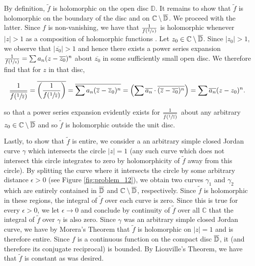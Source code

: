 \begin{solution}
    By definition, $\tilde{f}$ is holomorphic on the open disc $\mathbb{D}$. It remains to show that $\tilde{f}$ is 
    holomorphic on the boundary of the disc and on $\mathbb{C} \setminus \overline{\mathbb{D}}$. We proceed with the latter. Since $f$ 
    is non-vanishing, we have that $\frac{1}{f(\sfrac{1}{z})}$ is holomorphic whenever $|z| > 1$ as a composition of 
    holomorphic functions . Let $z_0 \in \mathbb{C} \setminus \overline{\mathbb{D}}$. Since $|z_0| > 1$, we observe that 
    $|\overline{z_0}| > 1$ and hence there exists a power series expansion 
    $\frac{1}{f(\sfrac{1}{z})} = \sum a_n (z - \overline{z_0})^n$ about $\overline{z_0}$ in some sufficiently small open 
    disc. We therefore find that for $z$ in that disc,

    $$
    \frac{1}{\overline{f(\sfrac{1}{\overline{z}})}}
    = \overline{\left(\frac{1}{f(\sfrac{1}{\overline{z}})} \right)} 
    = \overline{\sum a_n (\overline{z} - \overline{z}_0)^n}
    = \left( \sum \overline{a_n} \cdot \overline{(\overline{z} - \overline{z_0})^n} \right)
    = \sum \overline{a_n} (z - z_0)^n.
    $$

    so that a power series expansion evidently exists for $\frac{1}{\overline{f(\sfrac{1}{\overline{z}})}}$ about any 
    arbitrary $z_0 \in \mathbb{C} \setminus \overline{\mathbb{D}}$ and so $\tilde{f}$ is holomorphic outside the unit disc.

    Lastly, to show that $\tilde{f}$ is entire, we consider a an arbitrary simple closed Jordan curve $\gamma$ which 
    intersects the circle $|z| = 1$ (any such curve which does not intersect this circle integrates to zero by 
    holomorphicity of $\tilde{f}$ away from this circle). By splitting the curve where it intersects the circle by some 
    arbitrary distance $\epsilon > 0$ (see Figure \ref{fig:problem_12}), we obtain two curves $\gamma_1$ and $\gamma_2$ 
    which are entirely contained in $\overline{\mathbb{D}}$ and $\mathbb{C} \setminus \overline{\mathbb{D}}$, respectively. Since $\tilde{f}$ is
    holomorphic in these regions, the integral of $\tilde{f}$ over each curve is zero.  Since this is true for every 
    $\epsilon > 0$, we let $\epsilon \to 0$ and conclude by continuity of $\tilde{f}$ over all $\mathbb{C}$ that the 
    integral of $\tilde{f}$ over $\gamma$ is also zero. Since $\gamma$ was an arbitrary simple closed Jordan curve, we 
    have by Morera's Theorem that $\tilde{f}$ is holomorphic on $|z| = 1$ and is therefore entire. Since $f$ is a 
    continuous function on the compact disc $\overline{\mathbb{D}}$, it (and therefore its conjugate reciprocal) is bounded. By 
    Liouville's Theorem, we have that $\tilde{f}$ is constant as was desired.


\end{solution}
